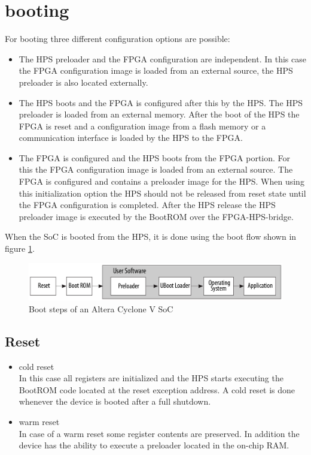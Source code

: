 \section{booting}
For booting three different configuration options are possible:\cite[chapter A]{AlteraHPS15}
\begin{itemize}
\item The HPS preloader and the FPGA configuration are independent. In this case the FPGA configuration image is loaded from an external source, the HPS preloader is also located externally.
\item The HPS boots and the FPGA is configured after this by the HPS. The HPS preloader is loaded from an external memory. After the boot of the HPS the FPGA is reset and a configuration image from a flash memory or a communication interface is loaded by the HPS to the FPGA.
\item The FPGA is configured and the HPS boots from the FPGA portion. For this the FPGA configuration image is loaded from an external source. The FPGA is configured and contains a preloader image for the HPS. When using this initialization option the HPS should not be released from reset state until the FPGA configuration is completed. After the HPS release the HPS preloader image is executed by the BootROM over the FPGA-HPS-bridge.
\end{itemize}
When the SoC is booted from the HPS, it is done using the boot flow shown in figure \ref{fig:bootstages}.
\begin{figure}[htbp]
\begin{center}
\includegraphics[width=13cm,keepaspectratio=true]{bilder/png/bootstages}
\caption{Boot steps of an Altera Cyclone V SoC\cite[chapter A]{AlteraHPS15}}
\label{fig:bootstages}
\end{center}
\end{figure}
\subsection{Reset}
\begin{itemize}
\item cold reset\\
In this case all registers are initialized and the HPS starts executing the BootROM code located at the reset exception address. A cold reset is done whenever the device is booted after a full shutdown.
\item warm reset\\
In case of a warm reset some register contents are preserved. In addition the device has the ability to execute a preloader located in the on-chip RAM.
\end{itemize}
